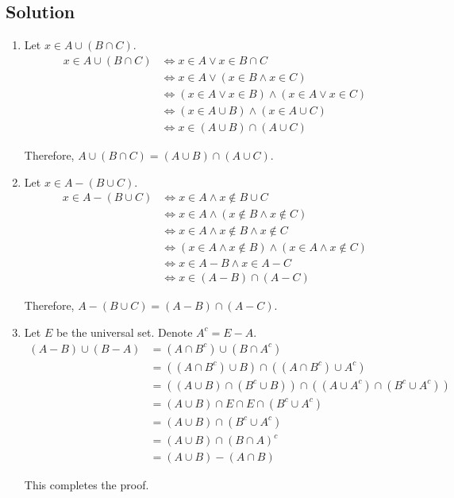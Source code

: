 \documentclass[12pt]{article}
\begin{document}
\subsection{Solution}
\begin{enumerate}
	\item Let $x \in A \cup(B \cap C)$.
	\begin{equation*}
	\begin{aligned}
	x \in A \cup(B \cap C) & \Leftrightarrow x \in A \vee x \in B \cap C\\
	&\Leftrightarrow x \in A \vee (x \in B \wedge x \in C)\\
	&\Leftrightarrow (x \in A \vee x \in B) \wedge (x \in A \vee x \in C)\\
	&\Leftrightarrow (x \in A \cup B) \wedge (x \in A \cup C)\\
	&\Leftrightarrow x \in (A \cup B) \cap(A \cup C)
	\end{aligned}
	\end{equation*}
	\par Therefore, $A \cup(B \cap C)=(A \cup B) \cap(A \cup C)$.
	\item Let $x \in A-(B \cup C)$.
	\begin{equation*}
	\begin{aligned}
	x \in A-(B \cup C) &\Leftrightarrow x \in A \wedge x \notin B \cup C\\
	&\Leftrightarrow x \in A \wedge (x \notin B \wedge x \notin C)\\
	&\Leftrightarrow x \in A \wedge x \notin B \wedge x \notin C\\
	&\Leftrightarrow (x \in A \wedge x \notin B) \wedge (x \in A \wedge x \notin C)\\
	&\Leftrightarrow x \in A-B \wedge x \in A-C\\
	&\Leftrightarrow x \in (A-B) \cap(A-C)
	\end{aligned}
	\end{equation*}
	\par Therefore, $A-(B \cup C)=(A-B) \cap(A-C)$.
	\item Let $E$ be the universal set. Denote $A^{c} = E-A$.
	\begin{equation*}
	\begin{aligned}
	(A-B) \cup(B-A) &=\left(A \cap B^{c}\right) \cup\left(B \cap A^{c}\right) \\
	&=\left(\left(A \cap B^{c}\right) \cup B\right) \cap\left(\left(A \cap B^{c}\right) \cup A^{c}\right) \\
	&=\left((A \cup B) \cap\left(B^{c} \cup B\right)\right) \cap\left(\left(A \cup A^{c}\right) \cap\left(B^{c} \cup A^{c}\right)\right) \\
	&=(A \cup B) \cap E \cap E \cap\left(B^{c} \cup A^{c}\right) \\
	&=(A \cup B) \cap\left(B^{c} \cup A^{c}\right) \\
	&=(A \cup B) \cap(B \cap A)^{c} \\
	&=(A \cup B)-(A \cap B)
	\end{aligned}
	\end{equation*}
	\par This completes the proof.
\end{enumerate}
\end{document}
